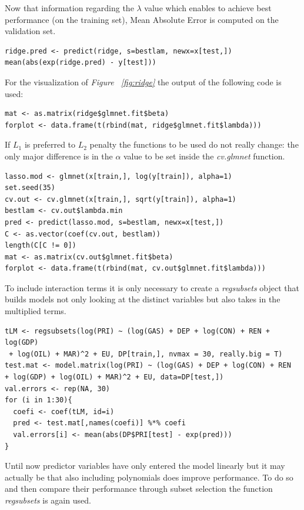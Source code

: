 \documentclass[a4paper,12pt]{book}
\begin{document}
Now that information regarding the $\lambda$ value which enables to achieve best performance (on the training set), Mean Absolute Error is computed on the validation set.

\begin{verbatim}
ridge.pred <- predict(ridge, s=bestlam, newx=x[test,])
mean(abs(exp(ridge.pred) - y[test]))
\end{verbatim}

For the visualization of \textit{Figure ~\ref{fig:ridge}} the output of the following code is used:

\begin{verbatim}
mat <- as.matrix(ridge$glmnet.fit$beta)
forplot <- data.frame(t(rbind(mat, ridge$glmnet.fit$lambda)))
\end{verbatim}

If $L_1$ is preferred to $L_2$ penalty the functions to be used do not really change: the only major difference is in the $\alpha$ value to be set inside the \textit{cv.glmnet} function. 

\begin{verbatim}
lasso.mod <- glmnet(x[train,], log(y[train]), alpha=1)
set.seed(35)
cv.out <- cv.glmnet(x[train,], sqrt(y[train]), alpha=1)
bestlam <- cv.out$lambda.min
pred <- predict(lasso.mod, s=bestlam, newx=x[test,])
C <- as.vector(coef(cv.out, bestlam))
length(C[C != 0])
mat <- as.matrix(cv.out$glmnet.fit$beta)
forplot <- data.frame(t(rbind(mat, cv.out$glmnet.fit$lambda)))
\end{verbatim}

To include interaction terms it is only necessary to create a \textit{regsubsets} object that builds models not only looking at the distinct variables but also takes in the multiplied terms.

\begin{verbatim}
tLM <- regsubsets(log(PRI) ~ (log(GAS) + DEP + log(CON) + REN + log(GDP)
 + log(OIL) + MAR)^2 + EU, DP[train,], nvmax = 30, really.big = T)
test.mat <- model.matrix(log(PRI) ~ (log(GAS) + DEP + log(CON) + REN 
+ log(GDP) + log(OIL) + MAR)^2 + EU, data=DP[test,])
val.errors <- rep(NA, 30)
for (i in 1:30){
  coefi <- coef(tLM, id=i)
  pred <- test.mat[,names(coefi)] %*% coefi
  val.errors[i] <- mean(abs(DP$PRI[test] - exp(pred)))
}
\end{verbatim}

Until now predictor variables have only entered the model linearly but it may actually be that also including polynomials does improve performance. To do so and then compare their performance through subset selection the function \textit{regsubsets} is again used.
\end{document}

